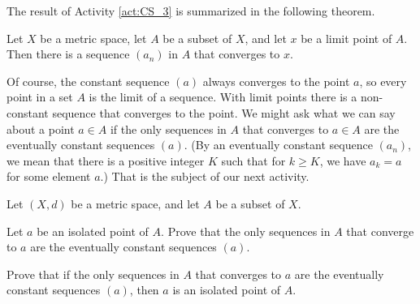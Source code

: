 \begin{comment}

\ActivitySolution

\ba
\item The fact that $B\left(x, \frac{1}{n}\right)$ is a neighborhood of $x$ implies that $B\left(x, \frac{1}{n}\right)$ must contain a point $a_n$ in $A$ different from $x$. 

\item Given any $\epsilon > 0$, we can choose $N$ such that $\frac{1}{N} < \epsilon$. So $n \geq N$ implies that $d(a_n,x) < \frac{1}{n} < \frac{1}{N} < \epsilon$. So $\lim a_n = x$. 

\ea

\end{comment}

The result of Activity \ref{act:CS_3} is summarized in the following theorem.

\begin{theorem} \label{thm:CS_limit_pt} Let $X$ be a metric space, let $A$ be a subset of $X$, and let $x$ be a limit point of $A$. Then there is a sequence $(a_n)$ in $A$ that converges to $x$.
\end{theorem}

Of course, the constant sequence $(a)$ always converges to the point $a$, so every point in a set $A$ is the limit of a sequence. With limit points there is a non-constant sequence that converges to the point. We might ask what we can say about a point $a \in A$ if the only sequences in $A$ that converges to $a \in A$ are the eventually constant sequences $(a)$. (By an eventually constant sequence $(a_n)$, we mean that there is a positive integer $K$ such that for $k \geq K$, we have $a_k = a$ for some element $a$.) That is the subject of our next activity. 

\begin{activity} Let $(X,d)$ be a metric space, and let $A$ be a subset of $X$.
\ba
\item Let $a$ be an isolated point of $A$. Prove that the only sequences in $A$ that converge to $a$ are the eventually constant sequences $(a)$. 

\item Prove that if the only sequences in $A$ that converges to $a$ are the eventually constant sequences $(a)$, then $a$ is an isolated point of $A$.

\ea

\end{activity}

